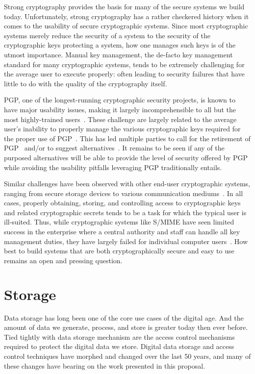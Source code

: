 Strong cryptography provides the basis for many of the secure systems
we build today. Unfortunately, strong cryptography has a rather
checkered history when it comes to the usability of secure
cryptographic systems. Since most cryptographic systems merely reduce
the security of a system to the security of the cryptographic keys
protecting a system, how one manages such keys is of the utmost
importance. Manual key management, the de-facto key management
standard for many cryptographic systems, tends to be extremely
challenging for the average user to execute properly: often leading to
security failures that have little to do with the quality of the
cryptography itself.

PGP, one of the longest-running cryptographic security projects, is
known to have major usability issues, making it largely
incomprehensible to all but the most highly-trained
users~\cite{whitten1999}. These challenge are largely related to the
average user's inability to properly manage the various cryptographic
keys required for the proper use of PGP~\cite{green-challenge}. This
has led multiple parties to call for the retirement of
PGP~\cite{green-pgp} and/or to suggest alternatives~\cite{mailpile,
  openwhisper, google-endtoend}. It remains to be seen if any of the
purposed alternatives will be able to provide the level of security
offered by PGP while avoiding the usability pitfalls leveraging PGP
traditionally entails.

Similar challenges have been observed with other end-user
cryptographic systems, ranging from secure storage devices to various
communication mediums~\cite{sweikata2009}. In all cases, properly
obtaining, storing, and controlling access to cryptographic keys and
related cryptographic secrets tends to be a task for which the typical
user is ill-suited. Thus, while cryptographic systems like S/MIME have
seen limited success in the enterprise where a central authority and
staff can handle all key management duties, they have largely failed
for individual computer users~\cite{ramsdell-rfc5751}. How best to
build systems that are both cryptographically secure and easy to use
remains an open and pressing question.

\section{Storage}
\label{chap:background:storage}

Data storage has long been one of the core use cases of the digital
age. And the amount of data we generate, process, and store is greater
today then ever before. Tied tightly with data storage mechanism are
the access control mechanisms required to protect the digital data we
store. Digital data storage and access control techniques have morphed
and changed over the last 50 years, and many of these changes have
bearing on the work presented in this proposal.

